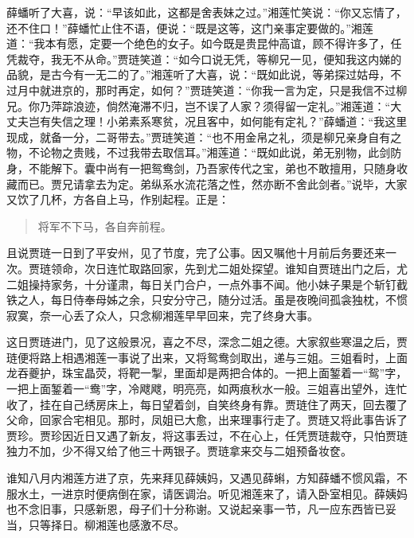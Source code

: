 \documentclass[12pt,oneside]{book}
\newenvironment{shici}{%
\begin{verse}%
\centering\large\hspace{12pt}}%
{\end{verse}}
\begin{document}
薛蟠听了大喜，说：“早该如此，这都是舍表妹之过。”湘莲忙笑说：“你又忘情了，还不住口！”薛蟠忙止住不语，便说：“既是这等，这门亲事定要做的。”湘莲道：“我本有愿，定要一个绝色的女子。如今既是贵昆仲高谊，顾不得许多了，任凭裁夺，我无不从命。”贾琏笑道：“如今口说无凭，等柳兄一见，便知我这内娣的品貌，是古今有一无二的了。”湘莲听了大喜，说：“既如此说，等弟探过姑母，不过月中就进京的，那时再定，如何？”贾琏笑道：“你我一言为定，只是我信不过柳兄。你乃萍踪浪迹，倘然淹滞不归，岂不误了人家？须得留一定礼。”湘莲道：“大丈夫岂有失信之理！小弟素系寒贫，况且客中，如何能有定礼？”薛蟠道：“我这里现成，就备一分，二哥带去。”贾琏笑道：“也不用金帛之礼，须是柳兄亲身自有之物，不论物之贵贱，不过我带去取信耳。”湘莲道：“既如此说，弟无别物，此剑防身，不能解下。囊中尚有一把鸳鸯剑，乃吾家传代之宝，弟也不敢擅用，只随身收藏而已。贾兄请拿去为定。弟纵系水流花落之性，然亦断不舍此剑者。”说毕，大家又饮了几杯，方各自上马，作别起程。正是：

\begin{shici}
将军不下马，各自奔前程。
\end{shici}


且说贾琏一日到了平安州，见了节度，完了公事。因又嘱他十月前后务要还来一次。贾琏领命，次日连忙取路回家，先到尤二姐处探望。谁知自贾琏出门之后，尤二姐操持家务，十分谨肃，每日关门合户，一点外事不闻。他小妹子果是个斩钉截铁之人，每日侍奉母姊之余，只安分守己，随分过活。虽是夜晚间孤衾独枕，不惯寂寞，奈一心丢了众人，只念柳湘莲早早回来，完了终身大事。

这日贾琏进门，见了这般景况，喜之不尽，深念二姐之德。大家叙些寒温之后，贾琏便将路上相遇湘莲一事说了出来，又将鸳鸯剑取出，递与三姐。三姐看时，上面龙吞夔护，珠宝晶荧，将靶一掣，里面却是两把合体的。一把上面錾着一“鸳”字，一把上面錾着一“鸯”字，冷飕飕，明亮亮，如两痕秋水一般。三姐喜出望外，连忙收了，挂在自己绣房床上，每日望着剑，自笑终身有靠。贾琏住了两天，回去覆了父命，回家合宅相见。那时，凤姐已大愈，出来理事行走了。贾琏又将此事告诉了贾珍。贾珍因近日又遇了新友，将这事丢过，不在心上，任凭贾琏裁夺，只怕贾琏独力不加，少不得又给了他三十两银子。贾琏拿来交与二姐预备妆奁。

谁知八月内湘莲方进了京，先来拜见薛姨妈，又遇见薛蝌，方知薛蟠不惯风霜，不服水土，一进京时便病倒在家，请医调治。听见湘莲来了，请入卧室相见。薛姨妈也不念旧事，只感新恩，母子们十分称谢。又说起亲事一节，凡一应东西皆已妥当，只等择日。柳湘莲也感激不尽。
\end{document}
